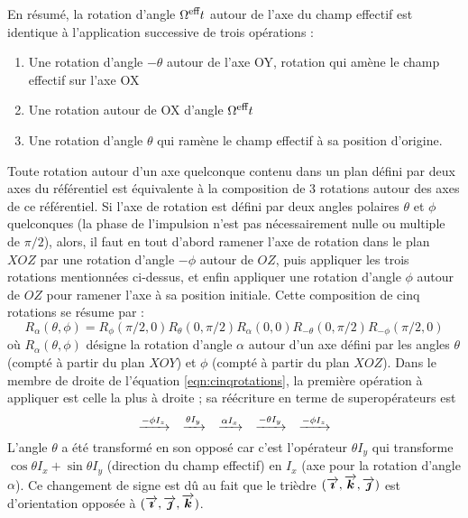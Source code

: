 En résumé, la rotation d'angle $\Omega^{\mbox{\footnotesize{eff}}} t$ autour de l'axe du champ effectif est identique
à l'application successive de trois opérations :
\begin{enumerate}
\item Une rotation d'angle $-\theta$ autour de l'axe OY, rotation qui amène le champ effectif
sur l'axe OX
\item Une rotation autour de OX d'angle $\Omega^{\mbox{\footnotesize{eff}}} t$
\item Une rotation d'angle $\theta$ qui ramène le champ effectif à sa position d'origine.
\end{enumerate}
Toute rotation autour d'un axe quelconque contenu dans un plan défini par deux
axes du référentiel
est équivalente à la composition de 3 rotations autour des axes de ce référentiel.
Si l'axe de rotation est défini par deux angles polaires $\theta$ et $\phi$ quelconques
(la phase de l'impulsion n'est pas nécessairement nulle ou multiple de $\pi/2$),
alors, il faut en tout d'abord ramener l'axe de rotation dans le plan $XOZ$ par une rotation
d'angle $-\phi$ autour de $OZ$, puis appliquer les trois rotations mentionnées ci-dessus,
et enfin appliquer une rotation d'angle $\phi$ autour de $OZ$ pour ramener l'axe à sa
position initiale. Cette composition de cinq rotations se résume par :
\begin{equation}
\label{eqn:cinqrotations}
R_{\alpha}(\theta, \phi) = 
R_{\phi}(\pi/2, 0)
R_{\theta}(0, \pi/2)
R_{\alpha}(0,0)
R_{-\theta}(0, \pi/2)
R_{-\phi}(\pi/2, 0)
\end{equation}
où $R_{\alpha}(\theta, \phi)$ désigne la rotation d'angle $\alpha$ autour d'un axe
défini par les angles $\theta$ (compté à partir du plan $XOY$) et $\phi$ (compté à partir
du plan $XOZ$). 
Dans le membre de droite de l'équation \ref{eqn:cinqrotations},
la première opération à appliquer est celle la plus à droite ;
sa réécriture en terme de superopérateurs est
\begin{equation}
\label{eqn:cinqrotationsop}
\xrightarrow{-\phi I_z}
\quad
\xrightarrow{\theta I_y}
\quad
\xrightarrow{\alpha I_x}
\quad
\xrightarrow{-\theta I_y}
\quad
\xrightarrow{-\phi I_z}
\end{equation}
L'angle $\theta$ a été transformé en son opposé car c'est l'opérateur
$\theta I_y$ qui transforme $\cos\theta I_x + \sin\theta I_y$ (direction
du champ effectif) en $I_x$ (axe pour la rotation d'angle $\alpha$).
Ce changement de signe est dû au fait que le trièdre $(\overrightarrow{\boldsymbol{\imath}}, \overrightarrow{\boldsymbol{k}}, \overrightarrow{\boldsymbol{\jmath}})$
est d'orientation opposée à $(\overrightarrow{\boldsymbol{\imath}}, \overrightarrow{\boldsymbol{\jmath}}, \overrightarrow{\boldsymbol{k}})$.

